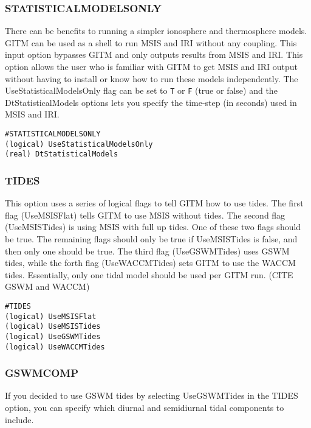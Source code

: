 \subsubsection{STATISTICALMODELSONLY}
\label{statisticalmodelsonly.sec}

There can be benefits to running a simpler ionosphere and thermosphere models.  GITM can be used as a shell to run MSIS and IRI without any coupling.  This input option bypasses GITM and only outputs results from MSIS and IRI.  This option allows the user who is familiar with GITM to get MSIS and IRI output without having to install or know how to run these models independently.  The UseStatisticalModelsOnly flag can be set to {\tt T} or {\tt F} (true or false) and the DtStatisticalModels options lets you specify the time-step (in seconds) used in MSIS and IRI.

\begin{verbatim}
#STATISTICALMODELSONLY
(logical) UseStatisticalModelsOnly
(real) DtStatisticalModels
\end{verbatim}

\subsubsection{TIDES}
\label{tides}

This option uses a series of logical flags to tell GITM how to use tides.   The first flag (UseMSISFlat) tells GITM to use MSIS without tides.  The second flag (UseMSISTides) is using MSIS with full up tides. One of these two flags should be true.  The remaining flags should only be true if UseMSISTides is false, and then only one should be true.  The third flag (UseGSWMTides) uses GSWM tides, while
the forth flag (UseWACCMTides) sets GITM to use the WACCM tides.  Essentially, only one tidal model should be used per GITM run. (CITE GSWM and WACCM)

\begin{verbatim}
#TIDES
(logical) UseMSISFlat      
(logical) UseMSISTides      
(logical) UseGSWMTides     
(logical) UseWACCMTides    
\end{verbatim}

\subsubsection{GSWMCOMP}
\label{gswmcomp.sec}

If you decided to use GSWM tides by selecting UseGSWMTides in the TIDES option, you can specify which diurnal and semidiurnal tidal components to include.

